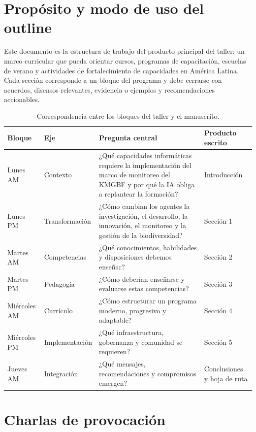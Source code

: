 \documentclass[11pt,a4paper]{article}
\begin{document}
\section*{Propósito y modo de uso del outline}

Este documento es la estructura de trabajo del producto principal del taller:
un marco curricular que pueda orientar cursos, programas de capacitación,
escuelas de verano y actividades de fortalecimiento de capacidades en América
Latina. Cada sección corresponde a un bloque del programa y debe cerrarse con
acuerdos, disensos relevantes, evidencia o ejemplos y recomendaciones
accionables.

\begin{table}[ht]
\centering
\small
\begin{tabularx}{\textwidth}{@{}p{2.2cm}p{2.7cm}X p{3.0cm}@{}}
\toprule
\textbf{Bloque} & \textbf{Eje} & \textbf{Pregunta central} &
\textbf{Producto escrito}\\
\midrule
Lunes AM & Contexto &
¿Qué capacidades informáticas requiere la implementación del marco de monitoreo
del KMGBF y por qué la IA obliga a replantear la formación? & Introducción\\
Lunes PM & Transformación &
¿Cómo cambian los agentes la investigación, el desarrollo, la innovación, el
monitoreo y la gestión de la biodiversidad? & Sección 1\\
Martes AM & Competencias &
¿Qué conocimientos, habilidades y disposiciones debemos enseñar? & Sección 2\\
Martes PM & Pedagogía &
¿Cómo deberían enseñarse y evaluarse estas competencias? & Sección 3\\
Miércoles AM & Currículo &
¿Cómo estructurar un programa moderno, progresivo y adaptable? & Sección 4\\
Miércoles PM & Implementación &
¿Qué infraestructura, gobernanza y comunidad se requieren? & Sección 5\\
Jueves AM & Integración &
¿Qué mensajes, recomendaciones y compromisos emergen? & Conclusiones y hoja de ruta\\
\bottomrule
\end{tabularx}
\caption{Correspondencia entre los bloques del taller y el manuscrito.}
\end{table}

\clearpage
\section*{Charlas de provocación}
\end{document}
